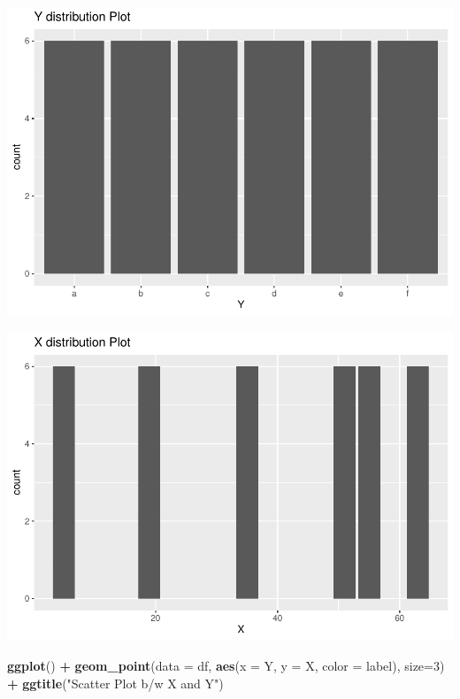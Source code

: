 \documentclass[
]{article}
\newenvironment{Shaded}{\begin{snugshade}}{\end{snugshade}}
\newcommand{\DataTypeTok}[1]{\textcolor[rgb]{0.13,0.29,0.53}{#1}}
\newcommand{\DecValTok}[1]{\textcolor[rgb]{0.00,0.00,0.81}{#1}}
\newcommand{\KeywordTok}[1]{\textcolor[rgb]{0.13,0.29,0.53}{\textbf{#1}}}
\newcommand{\NormalTok}[1]{#1}
\newcommand{\OperatorTok}[1]{\textcolor[rgb]{0.81,0.36,0.00}{\textbf{#1}}}
\newcommand{\StringTok}[1]{\textcolor[rgb]{0.31,0.60,0.02}{#1}}
\begin{document}
\includegraphics{622_HW1_files/figure-latex/unnamed-chunk-3-2.pdf}

\begin{Shaded}
\end{Shaded}

\includegraphics{622_HW1_files/figure-latex/unnamed-chunk-3-3.pdf}

\begin{Shaded}
\begin{Highlighting}[]
\KeywordTok{ggplot}\NormalTok{() }\OperatorTok{+}\StringTok{ }\KeywordTok{geom_point}\NormalTok{(}\DataTypeTok{data =}\NormalTok{ df, }\KeywordTok{aes}\NormalTok{(}\DataTypeTok{x =}\NormalTok{ Y, }\DataTypeTok{y =}\NormalTok{ X, }\DataTypeTok{color =}\NormalTok{ label), }\DataTypeTok{size=}\DecValTok{3}\NormalTok{) }\OperatorTok{+}\StringTok{ }\KeywordTok{ggtitle}\NormalTok{(}\StringTok{"Scatter Plot b/w X and Y"}\NormalTok{)}
\end{Highlighting}
\end{Shaded}
\end{document}
